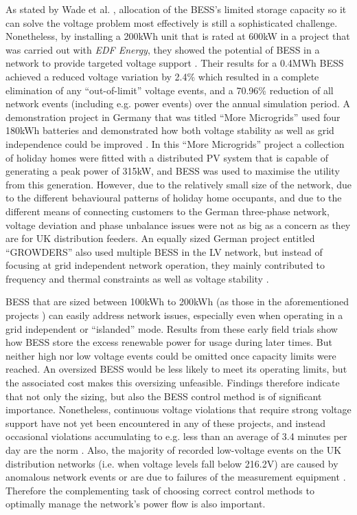 As stated by Wade et al. \cite{Wade2009}, allocation of the BESS's limited storage capacity so it can solve the voltage problem most effectively is still a sophisticated challenge.
Nonetheless, by installing a 200kWh unit that is rated at 600kW in a project that was carried out with \textit{EDF Energy}, they showed the potential of BESS in a network to provide targeted voltage support \cite{Wade2010}.
Their results for a 0.4MWh BESS achieved a reduced voltage variation by 2.4\% which resulted in a complete elimination of any ``out-of-limit'' voltage events, and a 70.96\% reduction of all network events (including e.g. power events) over the annual simulation period.
A demonstration project in Germany that was titled ``More Microgrids'' used four 180kWh batteries and demonstrated how both voltage stability as well as grid independence could be improved \cite{Overbeeke2010}.
In this ``More Microgrids'' project a collection of holiday homes were fitted with a distributed PV system that is capable of generating a peak power of 315kW, and BESS was used to maximise the utility from this generation.
However, due to the relatively small size of the network, due to the different behavioural patterns of holiday home occupants, and due to the different means of connecting customers to the German three-phase network, voltage deviation and phase unbalance issues were not as big as a concern as they are for UK distribution feeders.
An equally sized German project entitled ``GROWDERS'' also used multiple BESS in the LV network, but instead of focusing at grid independent network operation, they mainly contributed to frequency and thermal constraints as well as voltage stability \cite{GROWDERS2011}.

BESS that are sized between 100kWh to 200kWh (as those in the aforementioned projects \cite{Wade2010, Wade2009, Overbeeke2010, GROWDERS2011}) can easily address network issues, especially even when operating in a grid independent or ``islanded'' mode.
Results from these early field trials show how BESS store the excess renewable power for usage during later times.
But neither high nor low voltage events could be omitted once capacity limits were reached.
An oversized BESS would be less likely to meet its operating limits, but the associated cost makes this oversizing unfeasible.
Findings therefore indicate that not only the sizing, but also the BESS control method is of significant importance.
Nonetheless, continuous voltage violations that require strong voltage support have not yet been encountered in any of these projects, and instead occasional violations accumulating to e.g. less than an average of 3.4 minutes per day are the norm \cite{Sugihara2013}.
Also, the majority of recorded low-voltage events on the UK distribution networks (i.e. when voltage levels fall below 216.2V) are caused by anomalous network events or are due to failures of the measurement equipment \cite{UKPowerNetworks2014a}.
Therefore the complementing task of choosing correct control methods to optimally manage the network's power flow is also important.

